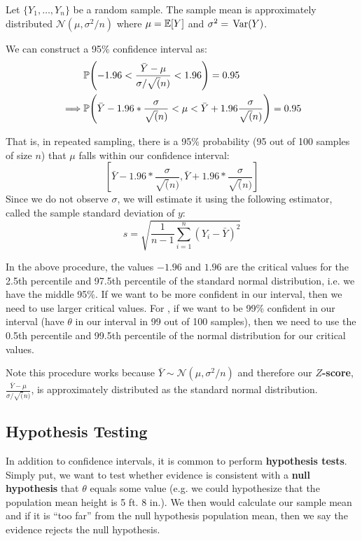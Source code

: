 \documentclass[12pt]{article}
\begin{document}
\begin{example}
  Let $\{ Y_1, \dots, Y_n \}$ be a random sample. The sample mean is approximately distributed $\mathcal{N}(\mu, \sigma^2 / n)$ where $\mu = \expec{Y}$ and $\sigma^2 = \var{Y}$.

  We can construct a 95\% confidence interval as:
  \begin{align*}
    &\P{-1.96 < \frac{\bar{Y} - \mu}{\sigma / \sqrt(n)} < 1.96} = 0.95 \\
    \implies &\P{\bar{Y} - 1.96 * \frac{\sigma}{\sqrt(n)} < \mu  < \bar{Y} + 1.96 \frac{\sigma}{\sqrt(n)}} = 0.95
  \end{align*}

  That is, in repeated sampling, there is a 95\% probability (95 out of 100 samples of size $n$) that $\mu$ falls within our confidence interval:
  $$
    \left[
      \bar{Y} - 1.96 * \frac{\sigma}{\sqrt(n)},
      \bar{Y} + 1.96 * \frac{\sigma}{\sqrt(n)}
    \right]
  $$
  Since we do not observe $\sigma$, we will estimate it using the following estimator, called the sample standard deviation of $y$:
  $$
    s = \sqrt{\frac{1}{n-1} \sum_{i=1}^n (Y_i - \bar{Y})^2}
  $$
\end{example}

In the above procedure, the values $-1.96$ and $1.96$ are the critical values for the 2.5th percentile and 97.5th percentile of the standard normal distribution, i.e. we have the middle 95\%. If we want to be more confident in our interval, then we need to use larger critical values. For , if we want to be 99\% confident in our interval (have $\theta$ in our interval in 99 out of 100 samples), then we need to use the 0.5th percentile and 99.5th percentile of the normal distribution for our critical values.

Note this procedure works because $\bar{Y} \sim \mathcal{N}(\mu, \sigma^2/n)$ and therefore our \textbf{$Z$-score}, $\frac{\bar{Y} - \mu}{\sigma / \sqrt(n)}$, is approximately distributed as the standard normal distribution.


\subsection*{Hypothesis Testing}

In addition to confidence intervals, it is common to perform \textbf{hypothesis tests}. Simply put, we want to test whether evidence is consistent with a \textbf{null hypothesis} that $\theta$ equals some value (e.g. we could hypothesize that the population mean height is 5 ft. 8 in.). We then would calculate our sample mean and if it is ``too far'' from the null hypothesis population mean, then we say the evidence rejects the null hypothesis.
\end{document}
